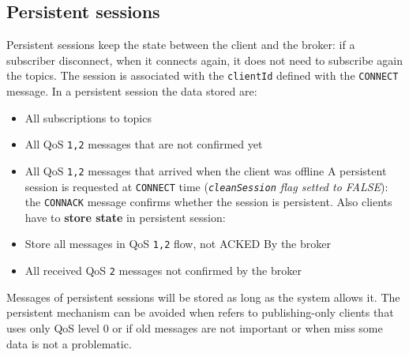 \documentclass[10pt,a4paper]{report}
\theoremstyle{definition}
\begin{document}
\subsection{Persistent sessions}\label{sec:persistent-sessions}
Persistent sessions keep the state between the client and the broker: if a subscriber disconnect, when it connects again, it does not need to subscribe again the topics. The session is associated with the \texttt{clientId} defined with the \texttt{CONNECT} message.
In a persistent session the data stored are:
\begin{itemize}
	\item 
	All subscriptions to topics
	\item 
	All QoS \texttt{1,2} messages that are not confirmed yet
	\item 
	All QoS \texttt{1,2} messages that arrived when the client was offline
	A persistent session is requested at \texttt{CONNECT} time (\textit{\texttt{cleanSession} flag setted to FALSE}): the \texttt{CONNACK} message confirms whether the session is persistent.
	Also clients have to \textbf{store state} in persistent session:
	\item 
	Store all messages in QoS \texttt{1,2} flow, not ACKED By the broker
	\item 
	All received QoS \texttt{2} messages not confirmed by the broker
	
\end{itemize}
Messages of persistent sessions will be stored as long as the system allows it. The persistent mechanism can be avoided when refers to publishing-only clients that uses only QoS level 0 or if old messages are not important or when miss some data is not a problematic.
\end{document}
